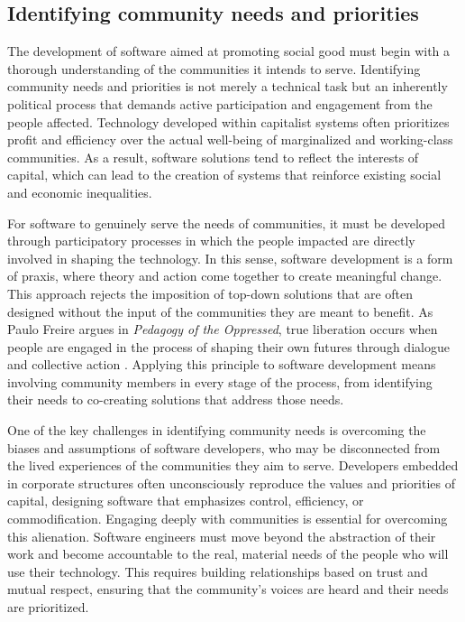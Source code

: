 \begin{refsection}
\subsection{Identifying community needs and priorities}

The development of software aimed at promoting social good must begin with a thorough understanding of the communities it intends to serve. Identifying community needs and priorities is not merely a technical task but an inherently political process that demands active participation and engagement from the people affected. Technology developed within capitalist systems often prioritizes profit and efficiency over the actual well-being of marginalized and working-class communities. As a result, software solutions tend to reflect the interests of capital, which can lead to the creation of systems that reinforce existing social and economic inequalities.

For software to genuinely serve the needs of communities, it must be developed through participatory processes in which the people impacted are directly involved in shaping the technology. In this sense, software development is a form of praxis, where theory and action come together to create meaningful change. This approach rejects the imposition of top-down solutions that are often designed without the input of the communities they are meant to benefit. As Paulo Freire argues in \textit{Pedagogy of the Oppressed}, true liberation occurs when people are engaged in the process of shaping their own futures through dialogue and collective action \cite[pp.~69-70]{freire2021}. Applying this principle to software development means involving community members in every stage of the process, from identifying their needs to co-creating solutions that address those needs.

One of the key challenges in identifying community needs is overcoming the biases and assumptions of software developers, who may be disconnected from the lived experiences of the communities they aim to serve. Developers embedded in corporate structures often unconsciously reproduce the values and priorities of capital, designing software that emphasizes control, efficiency, or commodification. Engaging deeply with communities is essential for overcoming this alienation. Software engineers must move beyond the abstraction of their work and become accountable to the real, material needs of the people who will use their technology. This requires building relationships based on trust and mutual respect, ensuring that the community’s voices are heard and their needs are prioritized.


\end{refsection}
